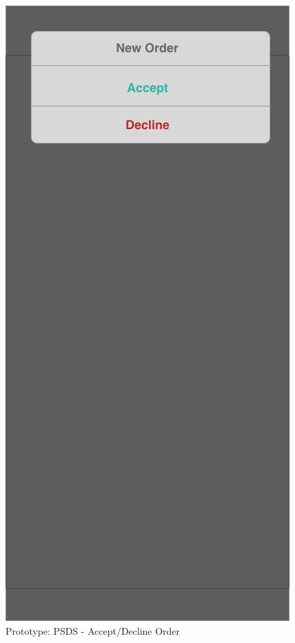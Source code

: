 \begin{figure}[ht]
    \centering
    \includegraphics[scale=0.50]{../images/prototype-psds-order.png}
    \caption{Prototype: PSDS - Accept/Decline Order}
    \label{fig:psds-prototype-order}
\end{figure}

